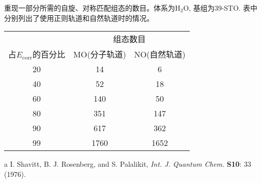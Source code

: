 \begin{threeparttable}[H]
	\caption{重现一部分所需的自旋、对称匹配组态的数目。体系为$\mathrm{H_2O}$, 基组为39-STO. 表中分别列出了使用正则轨道和自然轨道时的情况。}
	\centering
	\begin{tabular}{ccc}
		\hline
		                           & \multicolumn{2}{c}{组态数目} \\ \cline{2-3}
		占$E_\mathrm{corr}$的百分比 & MO(分子轨道) &   NO(自然轨道) \\ \hline
		          20               &    14        &       6       \\
		          40               &    52        &      18       \\
		          60               &   140        &      50       \\
		          80               &   351        &      147      \\
		          90               &   617        &      362      \\
		          99               &   1760       &     1652      \\ \hline
	\end{tabular}
	\begin{tablenotes}
		\item[a] I. Shavitt, B. J. Rosenberg, and S. Palalikit, \textit{Int. J. Quantum Chem.} \textbf{S10}: 33 (1976).
	\end{tablenotes}
\end{threeparttable}

